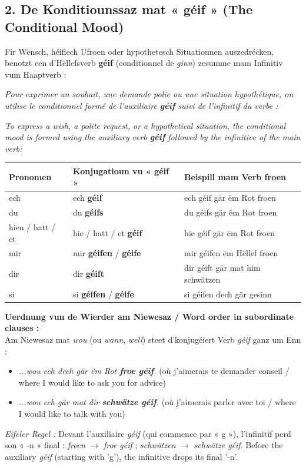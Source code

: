\vspace{0.6em}

\subsection[De Konditiounssaz mat géif / The Conditional with géif]{2. De Konditiounssaz mat « géif » (The Conditional Mood)}

Fir Wënsch, héiflech Ufroen oder hypothetesch Situatiounen auszedrécken, benotzt een d'Hëllefsverb \textbf{géif} (conditionnel de \textit{ginn}) zesumme mam Infinitiv vum Haaptverb :

\textit{Pour exprimer un souhait, une demande polie ou une situation hypothétique, on utilise le conditionnel formé de l'auxiliaire \textbf{géif} suivi de l'infinitif du verbe :}

\textit{To express a wish, a polite request, or a hypothetical situation, the conditional mood is formed using the auxiliary verb \textbf{géif} followed by the infinitive of the main verb:}

\begin{center}
\begin{tabular}{lll}
\toprule
\textbf{Pronomen} & \textbf{Konjugatioun vu « géif »} & \textbf{Beispill mam Verb froen} \\
\midrule
ech & ech \textbf{géif} & ech géif gär ëm Rot froen \\
du & du \textbf{géifs} & du géifs gär ëm Rot froen \\
hien / hatt / et & hie / hatt / et \textbf{géif} & hie géif gär ëm Rot froen \\
mir & mir \textbf{géifen} / \textbf{géife} & mir géifen ëm Hëllef froen \\
dir & dir \textbf{géift} & dir géift gär mat him schwätzen \\
si & si \textbf{géifen} / \textbf{géife} & si géifen dech gär gesinn \\
\bottomrule
\end{tabular}
\end{center}

\vspace{0.5em}

\textbf{Uerdnung vun de Wierder am Niewesaz / Word order in subordinate clauses :} \\
Am Niewesaz mat \textit{wou} (ou \textit{wann}, \textit{well}) steet d'konjugéiert Verb \textit{géif} ganz um Enn :
\begin{itemize}
    \item \textit{...wou ech dech gär ëm Rot \textbf{froe géif}.} (où j'aimerais te demander conseil / where I would like to ask you for advice)
    \item \textit{...wou ech gär mat dir \textbf{schwätze géif}.} (où j'aimerais parler avec toi / where I would like to talk with you)
\end{itemize}
\textit{Eifeler Regel :} Devant l'auxiliaire \textit{géif} (qui commence par « g »), l'infinitif perd son « -n » final : \textit{froen} $\rightarrow$ \textit{froe géif} ; \textit{schwätzen} $\rightarrow$ \textit{schwätze géif}. Before the auxiliary \textit{géif} (starting with 'g'), the infinitive drops its final '-n'.

